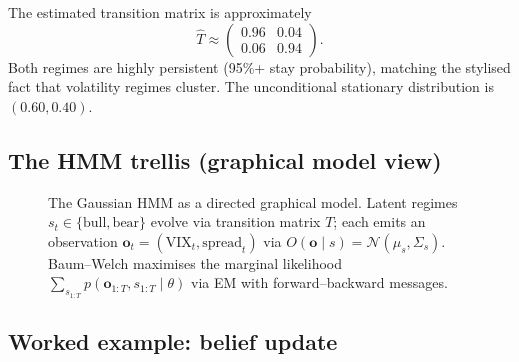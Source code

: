 \documentclass[11pt]{article}
\theoremstyle{plain1}
\theoremstyle{definition1}
\newcommand{\1}{\mathbf{1}}
\begin{document}
\noindent The estimated transition matrix is approximately
\[
\hat T \approx \begin{pmatrix} 0.96 & 0.04 \\ 0.06 & 0.94 \end{pmatrix}.
\]
Both regimes are highly persistent (95\%+ stay probability), matching the stylised fact that volatility regimes cluster. The unconditional stationary distribution is $(0.60, 0.40)$.

\subsection{The HMM trellis (graphical model view)}

\begin{figure}[H]\centering
{}
\caption{The Gaussian HMM as a directed graphical model. Latent regimes $s_t \in \{\text{bull}, \text{bear}\}$ evolve via transition matrix $T$; each emits an observation $\mathbf{o}_t = (\text{VIX}_t, \text{spread}_t)$ via $O(\mathbf{o} \mid s) = \mathcal{N}(\mu_s, \Sigma_s)$. Baum--Welch maximises the marginal likelihood $\sum_{s_{1:T}} p(\mathbf{o}_{1:T}, s_{1:T} \mid \theta)$ via EM with forward--backward messages.}\label{fig:hmm-trellis}
\end{figure}

\subsection{Worked example: belief update}
\end{document}
